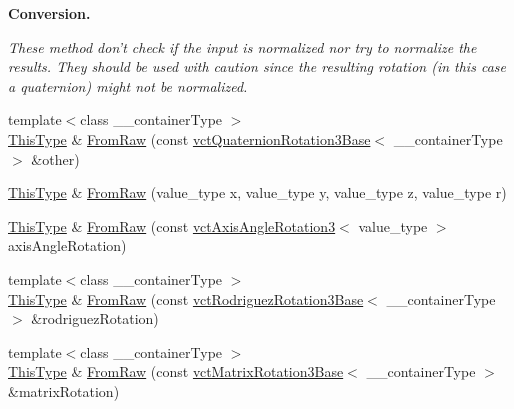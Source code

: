 \begin{Indent}{\bf Conversion.}\par
{\em These method don't check if the input is normalized nor try to normalize the results. They should be used with caution since the resulting rotation (in this case a quaternion) might not be normalized. }\begin{DoxyCompactItemize}
\item 
{\footnotesize template$<$class \-\_\-\-\_\-container\-Type $>$ }\\\hyperlink{classvct_quaternion_base_af28efdc38acf89acb7a67afada11408c}{This\-Type} \& \hyperlink{classvct_quaternion_rotation3_base_a6056404ea3fd12de1172be30ff2d5064}{From\-Raw} (const \hyperlink{classvct_quaternion_rotation3_base}{vct\-Quaternion\-Rotation3\-Base}$<$ \-\_\-\-\_\-container\-Type $>$ \&other)
\item 
\hyperlink{classvct_quaternion_base_af28efdc38acf89acb7a67afada11408c}{This\-Type} \& \hyperlink{classvct_quaternion_rotation3_base_aef7dd99f9111582ac3d9ccd6f6891c66}{From\-Raw} (value\-\_\-type x, value\-\_\-type y, value\-\_\-type z, value\-\_\-type r)
\item 
\hyperlink{classvct_quaternion_base_af28efdc38acf89acb7a67afada11408c}{This\-Type} \& \hyperlink{classvct_quaternion_rotation3_base_a6c8fa55dfd467386b467538d67916c41}{From\-Raw} (const \hyperlink{classvct_axis_angle_rotation3}{vct\-Axis\-Angle\-Rotation3}$<$ value\-\_\-type $>$ axis\-Angle\-Rotation)
\item 
{\footnotesize template$<$class \-\_\-\-\_\-container\-Type $>$ }\\\hyperlink{classvct_quaternion_base_af28efdc38acf89acb7a67afada11408c}{This\-Type} \& \hyperlink{classvct_quaternion_rotation3_base_ad820f69c1146537f1a2180008cff7905}{From\-Raw} (const \hyperlink{classvct_rodriguez_rotation3_base}{vct\-Rodriguez\-Rotation3\-Base}$<$ \-\_\-\-\_\-container\-Type $>$ \&rodriguez\-Rotation)
\item 
{\footnotesize template$<$class \-\_\-\-\_\-container\-Type $>$ }\\\hyperlink{classvct_quaternion_base_af28efdc38acf89acb7a67afada11408c}{This\-Type} \& \hyperlink{classvct_quaternion_rotation3_base_a477d0734a51969199fc5b781e64d9554}{From\-Raw} (const \hyperlink{classvct_matrix_rotation3_base}{vct\-Matrix\-Rotation3\-Base}$<$ \-\_\-\-\_\-container\-Type $>$ \&matrix\-Rotation)
\end{DoxyCompactItemize}
\end{Indent}
